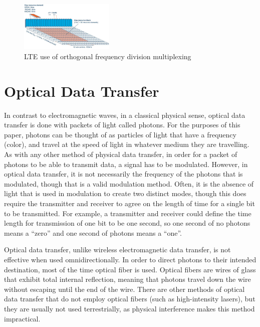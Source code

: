 \documentclass[11pt]{article}
\begin{document}
\begin{figure}[!htbp]
    \centering
    \includegraphics[width=0.4\textwidth]{OFDMDiagramForPaper.png}
    \caption{LTE use of orthogonal frequency division multiplexing}
    \label{fig:OFDMDiagram}

\end{figure}

\section{Optical Data Transfer}

In contrast to electromagnetic waves, in a classical physical sense, optical data transfer is done with packets of light called photons. For the purposes of this paper, photons can be thought of as particles of light that have a frequency (color), and travel at the speed of light in whatever medium they are travelling. As with any other method of physical data transfer, in order for a packet of photons to be able to transmit data, a signal has to be modulated. However, in optical data transfer, it is not necessarily the frequency of the photons that is modulated, though that is a valid modulation method. Often, it is the absence of light that is used in modulation to create two distinct modes, though this does require the transmitter and receiver to agree on the length of time for a single bit to be transmitted. For example, a transmitter and receiver could define the time length for transmission of one bit to be one second, so one second of no photons means a “zero” and one second of photons means a “one”. 

Optical data transfer, unlike wireless electromagnetic data transfer, is not effective when used omnidirectionally. In order to direct photons to their intended destination, most of the time optical fiber is used. Optical fibers are wires of glass that exhibit total internal reflection, meaning that photons travel down the wire without escaping until the end of the wire. There are other methods of optical data transfer that do not employ optical fibers (such as high-intensity lasers), but they are usually not used terrestrially, as physical interference makes this method impractical. 
\end{document}
